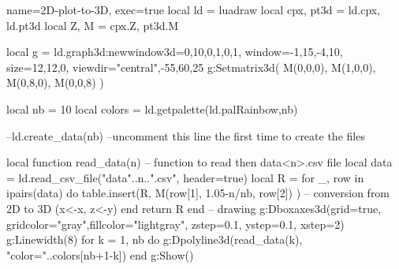 \documentclass[border=5pt]{standalone}%
\begin{document}
\begin{luadraw}{name=2D-plot-to-3D, exec=true}
local ld = luadraw
local cpx, pt3d = ld.cpx, ld.pt3d
local Z, M = cpx.Z, pt3d.M

local g = ld.graph3d:new{window3d={0,10,0,1,0,1}, window={-1,15,-4,10}, 
    size={12,12,0}, viewdir={"central",-55,60,25}}
g:Setmatrix3d({ M(0,0,0), M(1,0,0), M(0,8,0), M(0,0,8)} )
 
local nb = 10
local colors = ld.getpalette(ld.palRainbow,nb)

--ld.create_data(nb) --uncomment this line the first time to create the files

local function read_data(n) -- function to read then data<n>.csv file
    local data = ld.read_csv_file("data"..n..".csv", {header=true})
    local R = {}
    for _, row in ipairs(data) do
        table.insert(R, M(row[1], 1.05-n/nb, row[2]) ) -- conversion from 2D to 3D (x<-x, z<-y)
    end
    return R
end
-- drawing
g:Dboxaxes3d({grid=true, gridcolor="gray",fillcolor="lightgray", zstep=0.1, ystep=0.1, xstep=2})
g:Linewidth(8)
for k = 1, nb do
    g:Dpolyline3d(read_data(k), "color="..colors[nb+1-k])
end
g:Show()
\end{luadraw}
\end{document}
